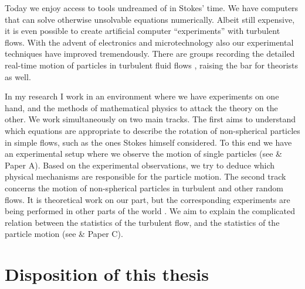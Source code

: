 \documentclass[thesis.tex]{subfiles}
\begin{document}
Today we enjoy access to tools undreamed of in Stokes' time. We have computers that can solve otherwise unsolvable equations numerically. Albeit still expensive, it is even possible to create artificial computer ``experiments'' with turbulent flows. With the advent of electronics and microtechnology also our experimental techniques have improved tremendously. There are groups recording the detailed real-time motion of particles in turbulent fluid flows \cite{zimmermann2011,parsa2012}, raising the bar for theorists as well.

In my research I work in an environment where we have experiments on one hand, and the methods of mathematical physics to attack the theory on the other. We work simultaneously on two main tracks. The first aims to understand which equations are appropriate to describe the rotation of non-spherical particles in simple flows, such as the ones Stokes himself considered. To this end we have an experimental setup where we observe the motion of single particles (see  \& Paper A). Based on the experimental observations, we try to deduce which physical mechanisms are responsible for the particle motion. The second track concerns the motion of non-spherical particles in turbulent and other random flows. It is theoretical work on our part, but the corresponding experiments are being performed in other parts of the world \cite{zimmermann2011,  parsa2012}. We aim to explain the complicated relation between the statistics of the turbulent flow, and the statistics of the particle motion (see  \& Paper C).


\section*{Disposition of this thesis}
\end{document}
